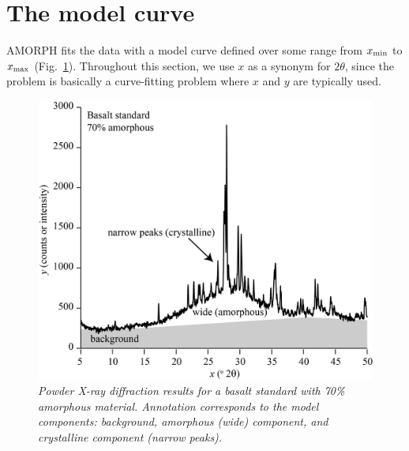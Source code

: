 \documentclass[preprint, a4paper]{elsarticle}
\begin{document}
\section{The model curve}\label{sec:model}

AMORPH fits the data with a model curve defined over some range from
$x_{\rm min}$ to $x_{\rm max}$ (Fig.~\ref{fig:example_data2}). Throughout this section, we use
$x$ as a synonym for $2\theta$, since the problem is basically a curve-fitting
problem where $x$ and $y$ are typically used.

\begin{figure}[!ht]
\centering
\includegraphics[width=.7\textwidth]{figures/example_data2.jpg}
\caption{\it Powder X-ray diffraction results for a basalt standard with 70\% amorphous material. Annotation corresponds to the model components: background, amorphous (wide) component, and crystalline component (narrow peaks).\label{fig:example_data2}}
\end{figure}
\end{document}
